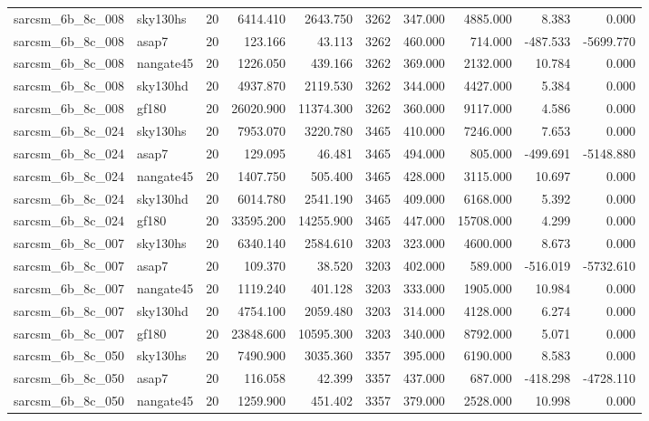\begin{longtable}{llrrrrrrrr}
sarcsm\_6b\_8c\_008 & sky130hs & 20 & 6414.410 & 2643.750 & 3262 & 347.000 & 4885.000 & 8.383 & 0.000 \\
sarcsm\_6b\_8c\_008 & asap7 & 20 & 123.166 & 43.113 & 3262 & 460.000 & 714.000 & -487.533 & -5699.770 \\
sarcsm\_6b\_8c\_008 & nangate45 & 20 & 1226.050 & 439.166 & 3262 & 369.000 & 2132.000 & 10.784 & 0.000 \\
sarcsm\_6b\_8c\_008 & sky130hd & 20 & 4937.870 & 2119.530 & 3262 & 344.000 & 4427.000 & 5.384 & 0.000 \\
sarcsm\_6b\_8c\_008 & gf180 & 20 & 26020.900 & 11374.300 & 3262 & 360.000 & 9117.000 & 4.586 & 0.000 \\
sarcsm\_6b\_8c\_024 & sky130hs & 20 & 7953.070 & 3220.780 & 3465 & 410.000 & 7246.000 & 7.653 & 0.000 \\
sarcsm\_6b\_8c\_024 & asap7 & 20 & 129.095 & 46.481 & 3465 & 494.000 & 805.000 & -499.691 & -5148.880 \\
sarcsm\_6b\_8c\_024 & nangate45 & 20 & 1407.750 & 505.400 & 3465 & 428.000 & 3115.000 & 10.697 & 0.000 \\
sarcsm\_6b\_8c\_024 & sky130hd & 20 & 6014.780 & 2541.190 & 3465 & 409.000 & 6168.000 & 5.392 & 0.000 \\
sarcsm\_6b\_8c\_024 & gf180 & 20 & 33595.200 & 14255.900 & 3465 & 447.000 & 15708.000 & 4.299 & 0.000 \\
sarcsm\_6b\_8c\_007 & sky130hs & 20 & 6340.140 & 2584.610 & 3203 & 323.000 & 4600.000 & 8.673 & 0.000 \\
sarcsm\_6b\_8c\_007 & asap7 & 20 & 109.370 & 38.520 & 3203 & 402.000 & 589.000 & -516.019 & -5732.610 \\
sarcsm\_6b\_8c\_007 & nangate45 & 20 & 1119.240 & 401.128 & 3203 & 333.000 & 1905.000 & 10.984 & 0.000 \\
sarcsm\_6b\_8c\_007 & sky130hd & 20 & 4754.100 & 2059.480 & 3203 & 314.000 & 4128.000 & 6.274 & 0.000 \\
sarcsm\_6b\_8c\_007 & gf180 & 20 & 23848.600 & 10595.300 & 3203 & 340.000 & 8792.000 & 5.071 & 0.000 \\
sarcsm\_6b\_8c\_050 & sky130hs & 20 & 7490.900 & 3035.360 & 3357 & 395.000 & 6190.000 & 8.583 & 0.000 \\
sarcsm\_6b\_8c\_050 & asap7 & 20 & 116.058 & 42.399 & 3357 & 437.000 & 687.000 & -418.298 & -4728.110 \\
sarcsm\_6b\_8c\_050 & nangate45 & 20 & 1259.900 & 451.402 & 3357 & 379.000 & 2528.000 & 10.998 & 0.000 \\

\end{longtable}
